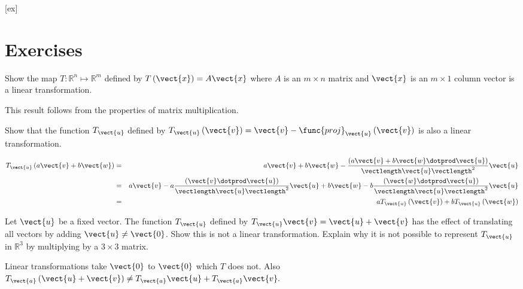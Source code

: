 [ex]
\section*{Exercises}

\begin{enumialphparenastyle}

\begin{ex} Show the map $T:\mathbb{R}^{n}\mapsto \mathbb{R}^{m}$ defined by 
$T\left( \vect{x} \right) =A\vect{x}$ where $A$ is an $m\times n$ matrix
and $\vect{x}$ is an $m\times 1$ column vector is a linear transformation. 
\begin{sol}
This result follows from the properties of matrix multiplication.
\end{sol}
\end{ex}

\begin{ex} Show that the function $T_{\vect{u}}$ defined by $T_{\vect{u}}
\left( \vect{v}\right) = \vect{v}-\func{proj}_{\vect{u}}\left(
\vect{v}\right) $ is also a linear transformation.
\begin{sol}
\begin{eqnarray*}
T_{\vect{u}}\left( a\vect{v}+b\vect{w}\right) &=&a\vect{v}+b\vect{w}-\frac{\left( a\vect{v}+b\vect{w}\dotprod \vect{u}\right) }{\vectlength \vect{u}
\vectlength ^{2}}\vect{u} \\
&=&a\vect{v}-a\frac{\left( \vect{v}\dotprod \vect{u}\right) }{\vectlength \vect{u} \vectlength ^{2}}\vect{u}+b\vect{w}-b\frac{\left( \vect{w}\dotprod \vect{u}
\right) }{\vectlength \vect{u}\vectlength ^{2}}\vect{u} \\
&=&aT_{\vect{u}}\left( \vect{v}\right) +bT_{\vect{u}}\left( \vect{w}
\right)
\end{eqnarray*}
\end{sol}
\end{ex}

\begin{ex} Let $\vect{u}$ be a fixed vector. The function 
$T_{\vect{u}}$ defined by $T_{\vect{u}}\vect{v}=\vect{u}+\vect{v}$ has the effect of
translating all vectors by adding $\vect{u}\neq \vect{0}$. Show this is not a
linear transformation. Explain why it is not possible to represent 
$T_{\vect{u}}$ in $\mathbb{R}^{3}$ by multiplying by a $3\times 3$ matrix.
\begin{sol}
Linear
transformations take $\vect{0}$ to $\vect{0}$ which $T$ does not. Also $T_{\vect{a}}\left( \vect{u}+\vect{v}\right) \neq T_{\vect{a}}\vect{u}+T_{\vect{a}}
\vect{v}.$
\end{sol}
\end{ex}

\end{enumialphparenastyle}